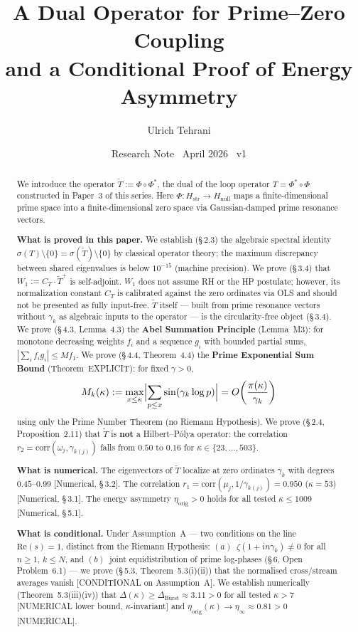 \documentclass[11pt]{article}
\title{\vspace{-1.5em}\bfseries A Dual Operator for Prime--Zero Coupling\\[0.4em]
\large and a Conditional Proof of Energy Asymmetry}
\author{Ulrich Tehrani}
\date{Research Note \textperiodcentered\ April 2026 \textperiodcentered\ v1}
\newcommand{\Hstr}{H_{\mathrm{str}}}
\newcommand{\Hnull}{H_{\mathrm{null}}}
\newcommand{\etaorig}{\eta_{\mathrm{orig}}}
\newcommand{\Tt}{\widetilde{T}}
\newcommand{\CT}{C_{T}}
\newcommand{\Wone}{W_1}
\newcommand{\Dburstvar}{\Delta_{\mathrm{Burst}}}
\begin{document}
\maketitle

\begin{abstract}
We introduce the operator $\Tt := \Phi \circ \Phi^*$,
the dual of the loop operator $T = \Phi^* \circ \Phi$ constructed in Paper~3
of this series. Here $\Phi\colon\Hstr \to \Hnull$ maps a
finite-dimensional prime space into a finite-dimensional zero space via
Gaussian-damped prime resonance vectors.

\textbf{What is proved in this paper.}
We establish (\S\,2.3) the algebraic spectral identity
$\sigma(T)\setminus\{0\} = \sigma(\Tt)\setminus\{0\}$
by classical operator theory; the maximum discrepancy between shared
eigenvalues is below $10^{-15}$ (machine precision).
We prove (\S\,3.4) that $\Wone := \CT\cdot\Tt^+$ is self-adjoint.
$\Wone$ does not assume RH or the HP postulate; however, its normalization
constant $\CT$ is calibrated against the zero ordinates via OLS and should
not be presented as fully input-free.
$\Tt$ itself --- built from prime resonance vectors without $\gamma_k$ as
algebraic inputs to the operator --- is the circularity-free object (\S\,3.4).
We prove (\S\,4.3, Lemma~4.3) the \textbf{Abel Summation Principle} (Lemma~M3):
for monotone decreasing weights $f_i$ and a sequence $g_i$ with bounded
partial sums, $|\sum_i f_i g_i| \leq M f_1$.
We prove (\S\,4.4, Theorem~4.4) the \textbf{Prime Exponential Sum Bound}
(Theorem~EXPLICIT): for fixed $\gamma > 0$,
\[
M_k(\kappa) := \max_{x \leq \kappa}\Bigl|\sum_{p \leq x}\sin(\gamma_k\log p)\Bigr|
= O\!\left(\frac{\pi(\kappa)}{\gamma_k}\right)
\]
using only the Prime Number Theorem (no Riemann Hypothesis).
We prove (\S\,2.4, Proposition~2.11) that $\Tt$ is \textbf{not} a
Hilbert--P\'olya operator: the correlation
$r_2 = \mathrm{corr}(\omega_j,\gamma_{k(j)})$
falls from $0.50$ to $0.16$ for $\kappa\in\{23,\ldots,503\}$.

\textbf{What is numerical.}
The eigenvectors of $\Tt$ localize at zero ordinates $\gamma_k$
with degrees $0.45$--$0.99$ [Numerical, \S\,3.2].
The correlation $r_1 = \mathrm{corr}(\mu_j,1/\gamma_{k(j)}) = 0.950$
($\kappa=53$) [Numerical, \S\,3.1].
The energy asymmetry $\etaorig > 0$ holds for all tested $\kappa\leq 1009$
[Numerical, \S\,5.1].

\textbf{What is conditional.}
Under Assumption~A --- two conditions on the line
$\mathrm{Re}(s)=1$, distinct from the Riemann Hypothesis:
$(a)$~$\zeta(1+in\gamma_k)\neq 0$ for all $n\geq 1$, $k\leq N$, and
$(b)$~joint equidistribution of prime log-phases (\S\,6, Open Problem~6.1)
--- we prove (\S\,5.3, Theorem~5.3(i)(ii)) that the normalised cross/stream
averages vanish [CONDITIONAL on Assumption~A].
We establish numerically (Theorem~5.3(iii)(iv)) that
$\Delta(\kappa)\geq\Dburstvar\approx 3.11 > 0$ for all tested $\kappa > 7$
[NUMERICAL lower bound, $\kappa$-invariant] and
$\etaorig(\kappa)\to\eta_\infty\approx 0.81 > 0$ [NUMERICAL].


\end{abstract}
\end{document}
